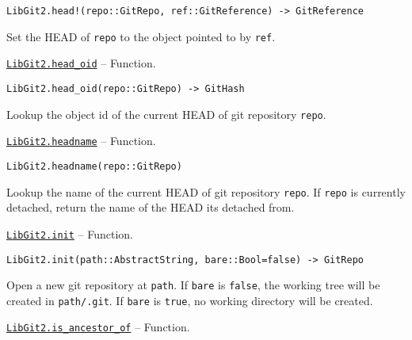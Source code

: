 \begin{adjustwidth}{2em}{0pt}


\begin{verbatim}
LibGit2.head!(repo::GitRepo, ref::GitReference) -> GitReference
\end{verbatim}

Set the HEAD of \texttt{repo} to the object pointed to by \texttt{ref}.



\end{adjustwidth}
\hypertarget{15860910592870539871}{} 
\hyperlink{15860910592870539871}{\texttt{LibGit2.head\_oid}}  -- {Function.}

\begin{adjustwidth}{2em}{0pt}


\begin{verbatim}
LibGit2.head_oid(repo::GitRepo) -> GitHash
\end{verbatim}

Lookup the object id of the current HEAD of git repository \texttt{repo}.



\end{adjustwidth}
\hypertarget{9819416665219430137}{} 
\hyperlink{9819416665219430137}{\texttt{LibGit2.headname}}  -- {Function.}

\begin{adjustwidth}{2em}{0pt}


\begin{verbatim}
LibGit2.headname(repo::GitRepo)
\end{verbatim}

Lookup the name of the current HEAD of git repository \texttt{repo}. If \texttt{repo} is currently detached, return the name of the HEAD it{\textquotesingle}s detached from.



\end{adjustwidth}
\hypertarget{234151039133609684}{} 
\hyperlink{234151039133609684}{\texttt{LibGit2.init}}  -- {Function.}

\begin{adjustwidth}{2em}{0pt}


\begin{verbatim}
LibGit2.init(path::AbstractString, bare::Bool=false) -> GitRepo
\end{verbatim}

Open a new git repository at \texttt{path}. If \texttt{bare} is \texttt{false}, the working tree will be created in \texttt{path/.git}. If \texttt{bare} is \texttt{true}, no working directory will be created.



\end{adjustwidth}
\hypertarget{330281650028652704}{} 
\hyperlink{330281650028652704}{\texttt{LibGit2.is\_ancestor\_of}}  -- {Function.}

